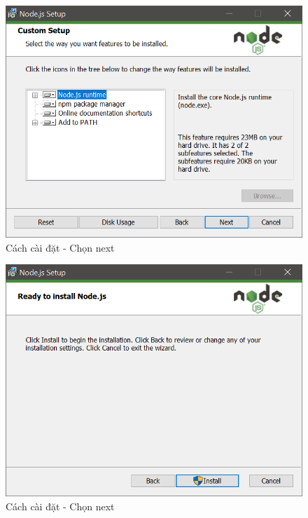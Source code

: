 \documentclass{report}
\begin{document}
\begin{center}
    \begin{figure}[htp]
    \begin{center}
     \includegraphics[scale=0.9]{install4.png}
    \end{center}
    \caption{Cách cài đặt - Chọn next}
    \label{refhinh1}
    \end{figure}
\end{center}

\begin{center}
    \begin{figure}[htp]
    \begin{center}
     \includegraphics[scale=0.9]{install5.png}
    \end{center}
    \caption{Cách cài đặt - Chọn next}
    \label{refhinh1}
    \end{figure}
\end{center}
\end{document}
